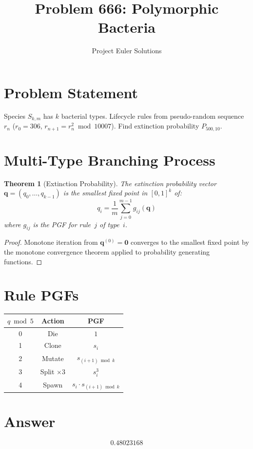 \documentclass[11pt]{article}
\title{Problem 666: Polymorphic Bacteria}
\author{Project Euler Solutions}
\date{}
\newtheorem{theorem}{Theorem}
\begin{document}
\maketitle

\section{Problem Statement}

Species $S_{k,m}$ has $k$ bacterial types. Lifecycle rules from pseudo-random sequence $r_n$ ($r_0 = 306$, $r_{n+1} = r_n^2 \bmod 10007$). Find extinction probability $P_{500,10}$.

\section{Multi-Type Branching Process}

\begin{theorem}[Extinction Probability]
The extinction probability vector $\mathbf{q} = (q_0, \ldots, q_{k-1})$ is the smallest fixed point in $[0,1]^k$ of:
\[
q_i = \frac{1}{m} \sum_{j=0}^{m-1} g_{ij}(\mathbf{q})
\]
where $g_{ij}$ is the PGF for rule~$j$ of type~$i$.
\end{theorem}

\begin{proof}
Monotone iteration from $\mathbf{q}^{(0)} = \mathbf{0}$ converges to the smallest fixed point by the monotone convergence theorem applied to probability generating functions.
\end{proof}

\section{Rule PGFs}

\begin{center}
\begin{tabular}{ccc}
\toprule
$q \bmod 5$ & Action & PGF \\
\midrule
0 & Die & $1$ \\
1 & Clone & $s_i$ \\
2 & Mutate & $s_{(i+1) \bmod k}$ \\
3 & Split $\times 3$ & $s_i^3$ \\
4 & Spawn & $s_i \cdot s_{(i+1) \bmod k}$ \\
\bottomrule
\end{tabular}
\end{center}

\section{Answer}

\[
\boxed{0.48023168}
\]
\end{document}
